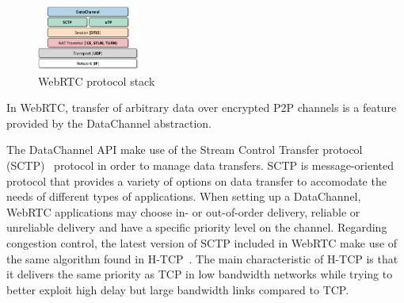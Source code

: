 \documentclass{sig-alternate}
\begin{document}




\begin{figure}[t]
  \centering
    \includegraphics[width=0.30\textwidth]{figs/architecture3}
\vspace*{-0.38cm}
	\caption{WebRTC protocol stack} \label{fig:architecture}
\vspace*{-0.4cm}
\end{figure}



In WebRTC, transfer of arbitrary data over encrypted P2P channels is a feature provided by
the DataChannel abstraction. 



The DataChannel API make use of the Stream Control Transfer protocol (SCTP)~\cite{sctp}
protocol in order to manage data transfers. SCTP is message-oriented protocol that
provides a variety of options on data transfer to accomodate the needs of different types
of applications. When setting up a DataChannel, WebRTC applications may choose in- or
out-of-order delivery, reliable or unreliable delivery and have a specific priority level
on the channel. Regarding congestion control, the latest version of SCTP included in
WebRTC make use of the same algorithm found in H-TCP~\cite{htcp}. The main characteristic
of H-TCP is that it delivers the same priority as TCP in low bandwidth networks while
trying to better exploit high delay but large bandwidth links compared to TCP.
\end{document}
